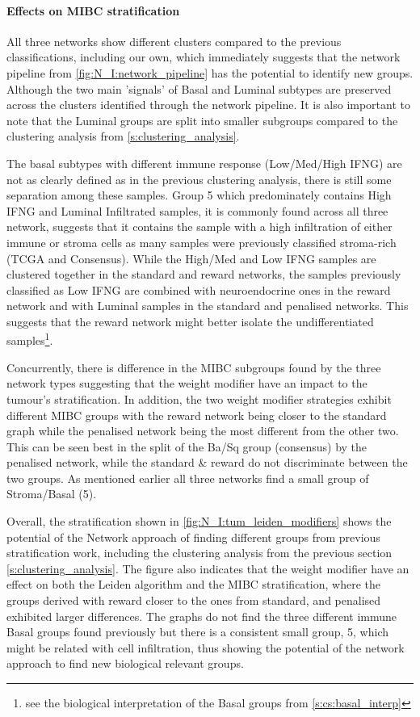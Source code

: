 \paragraph*{Effects on MIBC stratification}


All three networks show different clusters compared to the previous classifications, including our own, which immediately suggests that the network pipeline from \cref{fig:N_I:network_pipeline} has the potential to identify new groups. Although the two main 'signals' of Basal and Luminal subtypes are preserved across the clusters identified through the network pipeline. It is also important to note that the Luminal groups are split into smaller subgroups compared to the clustering analysis from \cref{s:clustering_analysis}. 

The basal subtypes with different immune response (Low/Med/High IFNG) are not as clearly defined as in the previous clustering analysis, there is still some separation among these samples. Group 5 which predominately contains High IFNG and Luminal Infiltrated samples, it is commonly found across all three network, suggests that it contains the sample with a high infiltration of either immune or stroma cells as many samples were previously classified stroma-rich (TCGA and Consensus). While the High/Med and Low IFNG samples are clustered together in the standard and reward networks, the samples previously classified as Low IFNG are combined with neuroendocrine ones in the reward network and with Luminal samples in the standard and penalised networks. This suggests that the reward network might better isolate the undifferentiated samples\footnote{see the biological interpretation of the Basal groups from \cref{s:cs:basal_interp}}.

Concurrently, there is difference in the MIBC subgroups found by the three network types suggesting that the weight modifier have an impact to the tumour's stratification. In addition, the two weight modifier strategies exhibit different MIBC groups with the reward network being closer to the standard graph while the penalised network being the most different from the other two. This can be seen best in the split of the Ba/Sq group (consensus) by the penalised network, while the standard \& reward do not discriminate between the two groups. As mentioned earlier all three networks find a small group of Stroma/Basal (5).

Overall, the stratification shown in \cref{fig:N_I:tum_leiden_modifiers} shows the potential of the Network approach of finding different groups from previous stratification work, including the clustering analysis from the previous section \cref{s:clustering_analysis}. The figure also indicates that the weight modifier have an effect on both the Leiden algorithm and the MIBC stratification, where the groups derived with reward closer to the ones from standard, and penalised exhibited larger differences. The graphs do not find the three different immune Basal groups found previously but there is a consistent small group, 5, which might be related with cell infiltration, thus showing the potential of the network approach to find new biological relevant groups.


